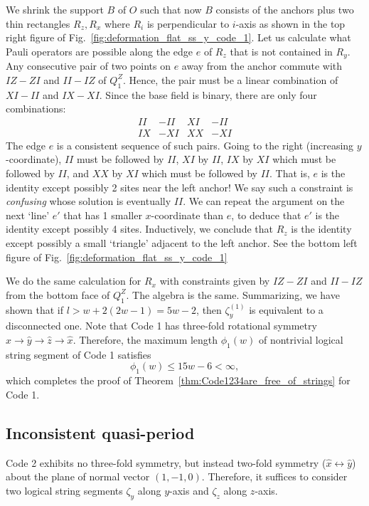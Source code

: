 \documentclass[letterpaper,10pt,pra,aps,showpacs,twocolumn]{revtex4-1}
\theoremstyle{definition} \newtheorem{defn}{Definition}
\theoremstyle{definition} \newtheorem{remark}{Remark}
\begin{document}
We shrink the support $B$ of $O$ such that now $B$ consists of the anchors plus two thin rectangles $R_z,R_x$ where $R_i$ is perpendicular to $i$-axis as shown in the top right figure of Fig.~\ref{fig:deformation_flat_ss_y_code_1}. Let us calculate what Pauli operators are possible along the edge $e$ of $R_z$ that is not contained in $R_y$. Any consecutive pair of two points on $e$ away from the anchor commute with $IZ-ZI$ and $II-IZ$ of $Q_1^Z$. Hence, the pair must be a linear combination of $XI-II$ and $IX-XI$. Since the base field is binary, there are only four combinations:
\begin{align*}
 II&-II &
 XI&-II \\
 IX&-XI &
 XX&-XI 
\end{align*}
The edge $e$ is a consistent sequence of such pairs. Going to the right (increasing $y$-coordinate), $II$ must be followed by $II$, $XI$ by $II$, $IX$ by $XI$ which must be followed by $II$, and $XX$ by $XI$ which must be followed by $II$. That is, $e$ is the identity except possibly 2 sites near the left anchor! We say such a constraint is \emph{confusing} whose solution is eventually $II$. We can repeat the argument on the next `line' $e'$ that has 1 smaller $x$-coordinate than $e$, to deduce that $e'$ is the identity except possibly 4 sites. Inductively, we conclude that $R_z$ is the identity except possibly a small `triangle' adjacent to the left anchor. See the bottom left figure of Fig.~\ref{fig:deformation_flat_ss_y_code_1}

We do the same calculation for $R_x$ with constraints given by $ IZ-ZI $ and $ II - IZ $ from the bottom face of $Q_1^Z$. The algebra is the same. Summarizing, we have shown that if $l > w + 2( 2w-1) = 5w -2$, then $\zeta^{(1)}_y$ is equivalent to a disconnected one. Note that Code 1 has three-fold rotational symmetry $\hat{x} \to \hat{y} \to \hat {z} \to \hat{x}$. Therefore, the maximum length $\phi_1(w)$ of nontrivial logical string segment of Code 1 satisfies
\[
 \phi_1(w) \leq 15w - 6 < \infty ,
\]
which completes the proof of Theorem~\ref{thm:Code1234are_free_of_strings} for Code 1.

\subsection{Inconsistent quasi-period}

Code 2 exhibits no three-fold symmetry, but instead two-fold symmetry ($\hat{x} \leftrightarrow \hat{y}$) about the plane of normal vector $(1,-1,0)$. Therefore, it suffices to consider two logical string segments $\zeta_y$ along $y$-axis and $\zeta_z$ along $z$-axis.
\end{document}
